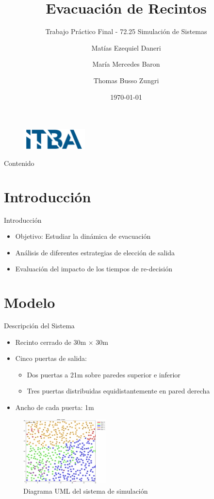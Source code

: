 \documentclass[aspectratio=169]{beamer}
\title{Evacuación de Recintos}
\subtitle{Trabajo Práctico Final - 72.25 Simulación de Sistemas}
\author{Matías Ezequiel Daneri \and María Mercedes Baron \and Thomas Busso Zungri}
\institute{Instituto Tecnológico de Buenos Aires}
\date{\today}
\begin{document}
\begin{frame}
    \titlepage
    \begin{figure}[h]
        \centering
        \includegraphics[width=0.3\textwidth]{img/Logo.png}
    \end{figure}
\end{frame}

\begin{frame}{Contenido}
    \tableofcontents
\end{frame}

\section{Introducción}
\begin{frame}{Introducción}
    \begin{itemize}
        \item Objetivo: Estudiar la dinámica de evacuación
        \item Análisis de diferentes estrategias de elección de salida
        \item Evaluación del impacto de los tiempos de re-decisión
    \end{itemize}
\end{frame}

\section{Modelo}

\begin{frame}{Descripción del Sistema}
    \begin{itemize}
        \item Recinto cerrado de 30m × 30m
        \item Cinco puertas de salida:
        \begin{itemize}
            \item Dos puertas a 21m sobre paredes superior e inferior
            \item Tres puertas distribuidas equidistantemente en pared derecha
        \end{itemize}
        \item Ancho de cada puerta: 1m
    \end{itemize}
    \begin{figure}
        \centering
        \includegraphics[width=0.4\textwidth]{img/frames/t_40_&_p_0.50.jpg}
        \caption{Diagrama UML del sistema de simulación}
    \end{figure}
\end{frame}
\end{document}
